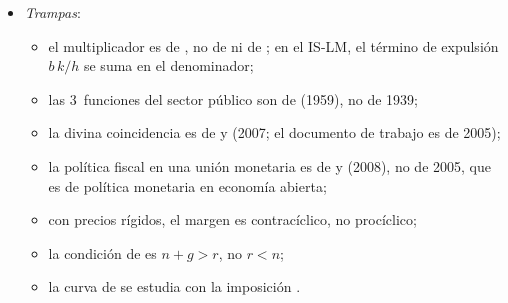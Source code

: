 \documentclass[11pt]{article}
\begin{document}
\begin{itemize}
\item \emph{Trampas}:
  \begin{itemize}
  \item el multiplicador es de , no de  ni de ; en el IS-LM, el término de expulsión $b\,k/h$ se suma en el denominador;
  \item las 3~funciones del sector público son de  (1959), no de 1939;
  \item la divina coincidencia es de  y  (2007; el documento de trabajo es de 2005)\nocite{BlanchardGali2007Real};
  \item la política fiscal en una unión monetaria es de  y  (2008), no de 2005, que es de política monetaria en economía abierta;
  \item con precios rígidos, el margen es contracíclico, no procíclico;
  \item la condición de  es $n+g>r$, no $r<n$;
  \item la curva de  se estudia con la imposición .
  \end{itemize}
\end{itemize}

\bibliografia
\end{document}
